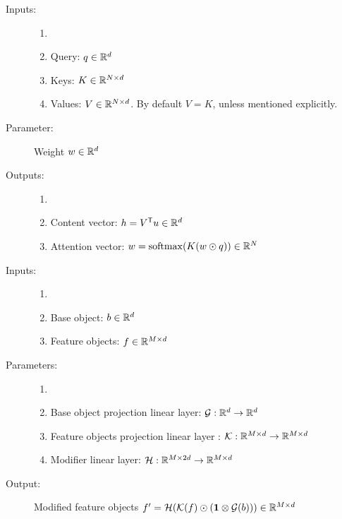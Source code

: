 
\begin{description}
	\item[Inputs:] 
	\begin{enumerate}
		\item[]
		\item Query: $q \in \mathbb{R}^d$
		\item Keys: $K \in \mathbb{R}^{N \times d}$	
		\item Values: $V \in \mathbb{R}^{N \times d}$. By default $V=K$, unless mentioned explicitly.	
	\end{enumerate}

	\item[Parameter:] Weight $w \in \mathbb{R}^d$

	\item[Outputs:] 
	\begin{enumerate}
		\item[]
		\item Content vector: $h =  V^{\mathsf{T}} u \in \mathbb{R}^d$
		\item Attention vector:  $w = \operatorname{\mathrm{softmax}}(K(w \odot q)) \in \mathbb{R}^N$
	\end{enumerate}
\end{description}



\begin{description}
	\item[Inputs:] 
	\begin{enumerate}
		\item[]
		\item Base object: $b \in \mathbb{R}^d$
		\item Feature objects: $f \in \mathbb{R}^{M \times d}$	
	\end{enumerate}
	
	\item[Parameters:] 
	\begin{enumerate}
	\item[]
	\item Base object projection linear layer: $\mathcal{G}: \mathbb{R}^d \to \mathbb{R}^d$
	\item Feature objects projection linear layer : $\mathcal{K}: \mathbb{R}^{M \times d} \to \mathbb{R}^{M \times d}$
	\item Modifier linear layer:  $\mathcal{H}: \mathbb{R}^{M \times 2d} \to \mathbb{R}^{M \times d}$	
\end{enumerate}
		
	\item[Output:] Modified feature objects 
	$f' =  \mathcal{H}( \mathcal{K}(f) \odot ( \mathbf{1} \otimes \mathcal{G}(b))) \in  \mathbb{R}^{M \times d}$
\end{description}

